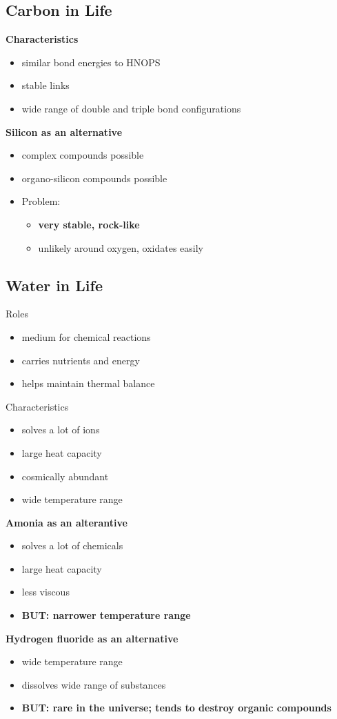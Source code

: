 \documentclass{article}
\theoremstyle{sltheorem}
\begin{document}
\subsection{Carbon in Life}
\textbf{Characteristics}
\begin{itemize}
	\item similar bond energies to HNOPS
	\item stable links
	\item wide range of double and triple bond configurations
\end{itemize}
\textbf{Silicon as an alternative}
\begin{itemize}
	\item complex compounds possible
	\item organo-silicon compounds possible
	\item Problem:
	      \begin{itemize}
		      \item \textbf{very stable, rock-like}
		      \item unlikely around oxygen, oxidates easily
	      \end{itemize}
\end{itemize}
\subsection{Water in Life}
Roles
\begin{itemize}
	\item medium for chemical reactions
	\item carries nutrients and energy
	\item helps maintain thermal balance
\end{itemize}
Characteristics
\begin{itemize}
	\item solves a lot of ions
	\item large heat capacity
	\item cosmically abundant
	\item wide temperature range
\end{itemize}
\textbf{Amonia as an alterantive}

\begin{itemize}
	\item solves a lot of chemicals
	\item large heat capacity
	\item less viscous
	\item \textbf{BUT: narrower temperature range}
\end{itemize}
\textbf{Hydrogen fluoride as an alternative}
\begin{itemize}
	\item wide temperature range
	\item dissolves wide range of substances
	\item \textbf{BUT: rare in the universe; tends to destroy organic compounds}
\end{itemize}
\end{document}
